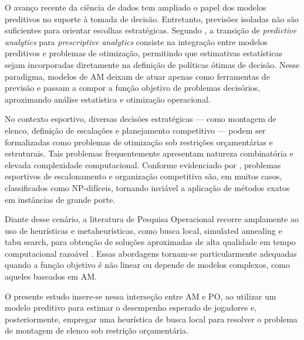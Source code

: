 O avanço recente da ciência de dados tem ampliado o papel dos modelos preditivos no suporte à tomada de decisão. Entretanto, previsões isoladas não são 
suficientes para orientar escolhas estratégicas. Segundo \cite{Bertsimas2019}, a transição de \textit{predictive analytics} 
para \textit{prescriptive analytics} consiste na integração entre modelos preditivos e problemas de otimização, permitindo que estimativas estatísticas 
sejam incorporadas diretamente na definição de políticas ótimas de decisão. Nesse paradigma, modelos de AM deixam de atuar apenas como 
ferramentas de previsão e passam a compor a função objetivo de problemas decisórios, aproximando análise estatística e otimização operacional.

No contexto esportivo, diversas decisões estratégicas — como montagem de elenco, definição de escalações e planejamento competitivo — podem ser formalizadas 
como problemas de otimização sob restrições orçamentárias e estruturais. Tais problemas frequentemente apresentam natureza combinatória 
e elevada complexidade computacional. Conforme evidenciado por \cite{Kendall2010}, problemas esportivos de escalonamento e organização competitiva 
são, em muitos casos, classificados como NP-difíceis, tornando inviável a aplicação de métodos exatos em instâncias de grande porte.

Diante desse cenário, a literatura de Pesquisa Operacional recorre amplamente ao uso de heurísticas e metaheurísticas, como busca local, 
simulated annealing e tabu search, para obtenção de soluções aproximadas de alta qualidade em tempo computacional razoável \cite{Kendall2010}. 
Essas abordagens tornam-se particularmente adequadas quando a função objetivo é não linear ou depende de modelos complexos, como aqueles baseados em AM.

O presente estudo insere-se nessa interseção entre AM e PO, ao utilizar um modelo preditivo para estimar o desempenho esperado de jogadores e, 
posteriormente, empregar uma heurística de busca local para resolver o problema de montagem de elenco sob restrição orçamentária.
